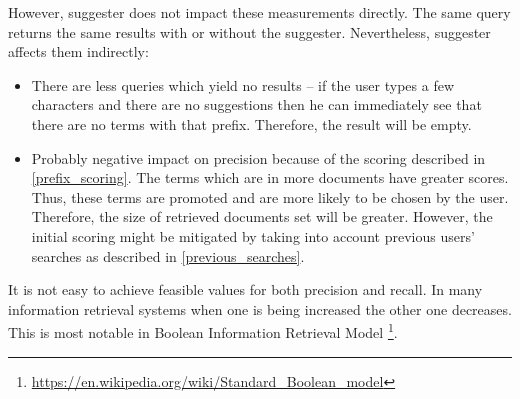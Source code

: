However, suggester does not impact these measurements directly. The same query returns the same results with or without
the suggester. Nevertheless, suggester affects them indirectly:
\begin{itemize}
    \item There are less queries which yield no results – if the user types a few characters and there are no suggestions then he
    can immediately see that there are no terms with that prefix. Therefore, the result will be empty.
    \item Probably negative impact on precision because of the scoring described in \ref{prefix_scoring}. The terms which
    are in more documents have greater scores. Thus, these terms are promoted and are more likely to be chosen by the user.
    Therefore, the size of retrieved documents set will be greater. However, the initial scoring might be mitigated
    by taking into account previous users' searches as described in \ref{previous_searches}.
\end{itemize}

It is not easy to achieve feasible values for both precision and recall. In many information retrieval systems when one is
being increased the other one decreases. This is most notable in Boolean Information Retrieval Model
\footnote{\url{https://en.wikipedia.org/wiki/Standard\_Boolean\_model}}.


